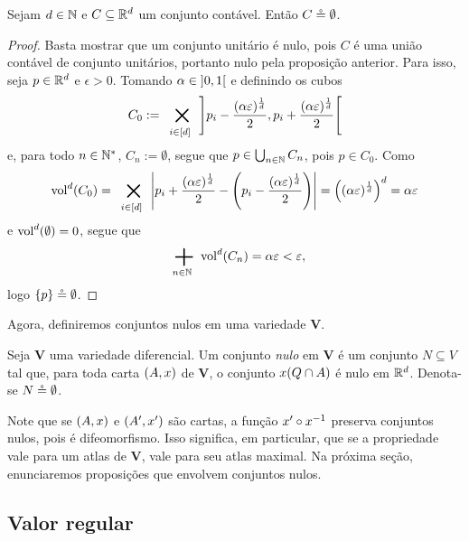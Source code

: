 \begin{proposition}
Sejam $d \in \mathbb{N}$ e $C \subseteq \mathbb{R}^d$ um conjunto contável. Então $C \circeq \emptyset$.
\end{proposition}
\begin{proof}
Basta mostrar que um conjunto unitário é nulo, pois $C$ é uma união contável de conjunto unitários, portanto nulo pela proposição anterior. Para isso, seja $p \in \mathbb{R}^d$ e $\epsilon > 0$. Tomando $\alpha \in \left]0,\allowbreak 1\right[$ e definindo os cubos
		\begin{equation*}
		C_0 := \bigtimes_{i \in [d]} \intaa{p_i - \frac{(\alpha\varepsilon)^{\frac{1}{d}}}{2}}{p_i + \frac{(\alpha\varepsilon)^{\frac{1}{d}}}{2}}
		\end{equation*}
e, para todo $n \in \mathbb{N}^*$, $C_n := \emptyset$, segue que $p \in \bigcup_{n \in \mathbb{N}} C_n$, pois $p \in C_0$. Como
	\begin{equation*}
	\vol^d(C_0) = \bigtimes_{i \in [d]} \abs{p_i + \frac{(\alpha\varepsilon)^{\frac{1}{d}}}{2} - \left(p_i - \frac{(\alpha\varepsilon)^{\frac{1}{d}}}{2} \right)} = \left( (\alpha\varepsilon)^{\frac{1}{d}} \right)^d = \alpha\varepsilon
	\end{equation*}
e $\operatorname{vol}^d(\emptyset)=0$, segue que
	\begin{equation*}
	\sum_{n \in \N} \vol^d(C_n) = \alpha\varepsilon < \varepsilon,
	\end{equation*}
logo $\{p\} \circeq \emptyset$.
\end{proof}

Agora, definiremos conjuntos nulos em uma variedade $\bm V$.

\begin{definition}
Seja $\bm V$ uma variedade diferencial. Um conjunto \emph{nulo} em $\bm V$ é um conjunto $N \subseteq V$ tal que, para toda carta $(A,x)$ de $\bm V$, o conjunto $x(Q \cap A)$ é nulo em $\mathbb{R}^d$. Denota-se $N \circeq \emptyset$.
\end{definition}

Note que se $(A,x)$ e $(A',x')$ são cartas, a função $x' \circ x^{-1}$ preserva conjuntos nulos, pois é difeomorfismo. Isso significa, em particular, que se a propriedade vale para um atlas de $\bm V$, vale para seu atlas maximal. Na próxima seção, enunciaremos proposições que envolvem conjuntos nulos.

\subsection{Valor regular}

